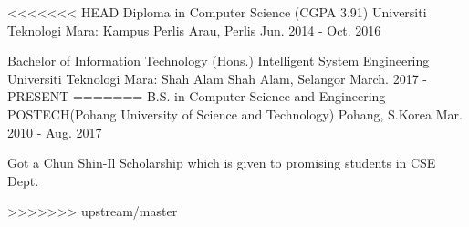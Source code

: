 

\begin{cventries}


  \cventry
<<<<<<< HEAD
    {Diploma in Computer Science (CGPA 3.91)}
    {Universiti Teknologi Mara: Kampus Perlis}
    {Arau, Perlis}
    {Jun. 2014 - Oct. 2016}
    {}

   \cventry
    {Bachelor of Information Technology (Hons.) Intelligent System Engineering}
    {Universiti Teknologi Mara: Shah Alam}
    {Shah Alam, Selangor}
    {March. 2017 - PRESENT}
    {}
=======
    {B.S. in Computer Science and Engineering} %
    {POSTECH(Pohang University of Science and Technology)} %
    {Pohang, S.Korea} %
    {Mar. 2010 - Aug. 2017} %
    {
      \begin{cvitems} %
        \item {Got a Chun Shin-Il Scholarship which is given to promising students in CSE Dept.}
      \end{cvitems}
    }
>>>>>>> upstream/master

\end{cventries}
